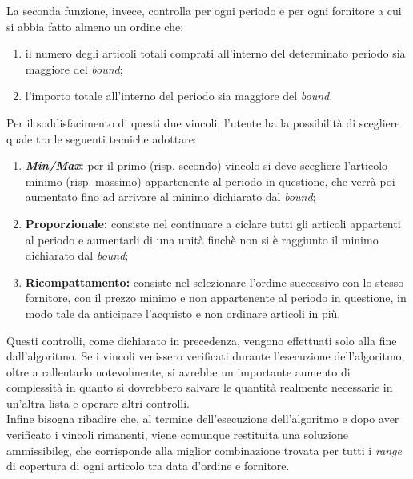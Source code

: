 \vspace*{0.5cm}
\noindent La seconda funzione, invece, controlla per ogni 
periodo e per ogni fornitore a cui si abbia fatto
almeno un ordine che:
\begin{enumerate}
    \item il numero degli articoli totali comprati all'interno
    del determinato periodo sia maggiore del \textit{bound};
    \item l'importo totale all'interno del periodo sia
    maggiore del \textit{bound}.
\end{enumerate}
Per il soddisfacimento di questi due vincoli, l'utente ha la
possibilità di scegliere quale tra le seguenti tecniche adottare:
\begin{enumerate}
    \item \textbf{\textit{Min/Max}:} per il primo (risp. secondo) vincolo
    si deve scegliere l'articolo minimo (risp. massimo) appartenente al periodo in questione,
    che verrà poi aumentato fino ad arrivare al
    minimo dichiarato dal \textit{bound};
    \item \textbf{Proporzionale:} consiste nel continuare a ciclare
    tutti gli articoli appartenti al periodo e aumentarli di
    una unità finchè non si è raggiunto il minimo
    dichiarato dal \textit{bound};
    \item \textbf{Ricompattamento:} consiste nel selezionare l'ordine
    successivo con lo stesso fornitore, con il prezzo minimo e
    non appartenente al periodo in questione, in modo tale da anticipare l'acquisto
    e non ordinare articoli in più.
\end{enumerate}
\vspace*{0.5cm}
\noindent Questi controlli, come dichiarato in precedenza, vengono effettuati solo alla fine dall'algoritmo.
Se i vincoli venissero verificati durante l'esecuzione dell'algoritmo,
oltre a rallentarlo notevolmente, si avrebbe un importante aumento di
complessità in quanto si dovrebbero salvare le quantità realmente
necessarie in un'altra lista e operare altri controlli.\\
Infine bisogna ribadire che, al termine dell'esecuzione
dell'algoritmo e dopo aver verificato i vincoli rimanenti, viene comunque restituita una soluzione \gls{ammissibileg}, che corrisponde
alla miglior combinazione trovata per tutti i \textit{range} di copertura di
ogni articolo tra data d'ordine e fornitore.\\

\newpage

